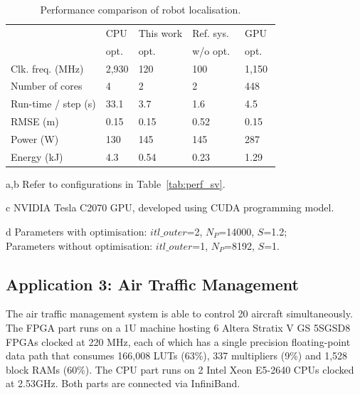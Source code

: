 \begin{table}[h]
	\setlength{\tabcolsep}{2pt}
	\begin{spacing}{1.0}
	\caption{Performance comparison of robot localisation.}
	\label{tab:perf_mcl1}
	\centering
	\smallskip
	\begin{threeparttable}
		\begin{tabular}{l|x{3cm}y{3cm}x{3cm}x{3cm}}
			\hline
															& CPU 							& This work  				& Ref. sys.~\cite{chau13a}  	& GPU \\
															& opt.~		&	opt.~		& w/o opt.~		& opt. ~ \\
			\hline
			\hline
			Clk. freq. (MHz) 	& 2,930 & 120 	& 100 	& 1,150 \\
			Number of cores					& 4		& 2 	& 2 	& 448 \\
			\hline
			\hline
			Run-time / step (s) 	& 33.1	& 3.7	& 1.6			& 4.5 \\
			RMSE (m)								& 0.15	& 0.15	& 0.52	& 0.15 \\
			Power (W)								& 130		& 145 	& 145		& 287 \\
			Energy (kJ)							& 4.3		& 0.54	& 0.23	& 1.29 \\
			\hline
		\end{tabular}
		\begin{tablenotes}
		\item[a,b] Refer to configurations in Table~\ref{tab:perf_sv}.
		\item[c] NVIDIA Tesla C2070 GPU, developed using CUDA programming model.
		\item[d] Parameters with optimisation: $itl\_outer$=2, $N_P$=14000, $S$=1.2; \\ Parameters without optimisation: $itl\_outer$=1, $N_P$=8192, $S$=1. 
		\end{tablenotes}
	\end{threeparttable}
	\end{spacing}
\end{table}

\subsection{Application 3: Air Traffic Management}

The air traffic management system is able to control 20 aircraft simultaneously.
The FPGA part runs on a 1U machine hosting 6 Altera Stratix V GS 5SGSD8 FPGAs clocked at 220 MHz, 
each of which has a single precision floating-point data path that consumes 166,008 LUTs (63\%), 337 multipliers (9\%) and 1,528 block RAMs (60\%).
The CPU part runs on 2 Intel Xeon E5-2640 CPUs clocked at 2.53GHz.
Both parts are connected via InfiniBand.

